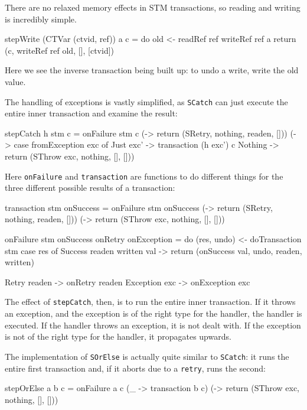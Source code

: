 There are no relaxed memory effects in STM transactions, so reading
and writing is incredibly simple.

\begin{haskellcode}
stepWrite (CTVar (ctvid, ref)) a c = do
  old <- readRef ref
  writeRef ref a
  return (c, writeRef ref old, [], [ctvid])
\end{haskellcode}

Here we see the inverse transaction being built up: to undo a write,
write the old value.

The handling of exceptions is vastly simplified, as \verb|SCatch| can
just execute the entire inner transaction and examine the result:

\begin{haskellcode}
stepCatch h stm c = onFailure stm c
  (\readen -> return (SRetry, nothing, readen, []))
  (\exc    -> case fromException exc of
    Just exc' -> transaction (h exc') c
    Nothing   -> return (SThrow exc, nothing, [], []))
\end{haskellcode}

Here \verb|onFailure| and \verb|transaction| are functions to do
different things for the three different possible results of a
transaction:

\begin{haskellcode}
transaction stm onSuccess = onFailure stm onSuccess
  (\readen -> return (SRetry, nothing, readen, []))
  (\exc    -> return (SThrow exc, nothing, [], []))

onFailure stm onSuccess onRetry onException = do
  (res, undo) <- doTransaction stm
  case res of
    Success readen written val -> return (onSuccess val, undo, readen, written)

    Retry readen  -> onRetry readen
    Exception exc -> onException exc
\end{haskellcode}

The effect of \verb|stepCatch|, then, is to run the entire inner
transaction. If it throws an exception, and the exception is of the
right type for the handler, the handler is executed. If the handler
throws an exception, it is not dealt with. If the exception is not of
the right type for the handler, it propagates upwards.

The implementation of \verb|SOrElse| is actually quite similar to
\verb|SCatch|: it runs the entire first transaction and, if it aborts
due to a \verb|retry|, runs the second:

\begin{haskellcode}
stepOrElse a b c = onFailure a c
  (\_   -> transaction b c)
  (\exc -> return (SThrow exc, nothing, [], []))
\end{haskellcode}

